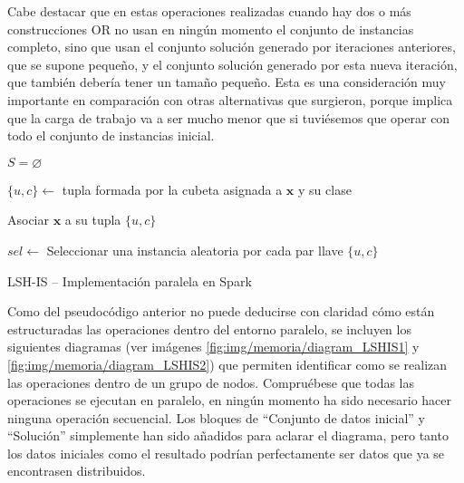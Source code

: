 Cabe destacar que en estas operaciones realizadas cuando hay dos o más construcciones OR no usan en ningún momento el conjunto de instancias completo, sino que usan el conjunto solución generado por iteraciones anteriores, que se supone pequeño, y el conjunto solución generado por esta nueva iteración, que también debería tener un tamaño pequeño. Esta es una consideración muy importante en comparación con otras alternativas que surgieron, porque implica que la carga de trabajo va a ser mucho menor que si tuviésemos que operar con todo el conjunto de instancias inicial.


\begin{algorithm*}
\DontPrintSemicolon
{}

$ S = \varnothing $

 {

   {
        $\{u,c\}\leftarrow$ tupla formada por la cubeta asignada a $\mathbf{x}$ y su clase

        Asociar $\mathbf{x}$ a su tupla $\{u,c\}$
    }

    $sel\leftarrow$ Seleccionar una instancia aleatoria por cada par llave $\{u,c\}$


}

\caption{LSH-IS -- Implementación paralela en Spark}
\label{alg:LSHISSPARK}
\end{algorithm*}

Como del pseudocódigo anterior no puede deducirse con claridad cómo están estructuradas las operaciones dentro del entorno paralelo, se incluyen los siguientes diagramas (ver imágenes \ref{fig:img/memoria/diagram_LSHIS1} y \ref{fig:img/memoria/diagram_LSHIS2}) que permiten identificar como se realizan las operaciones dentro de un grupo de nodos. Compruébese que todas las operaciones se ejecutan en paralelo, en ningún momento ha sido necesario hacer ninguna operación secuencial. Los bloques de ``Conjunto de datos inicial'' y ``Solución'' simplemente han sido añadidos para aclarar el diagrama, pero tanto los datos iniciales como el resultado podrían perfectamente ser datos que ya se encontrasen distribuidos.

